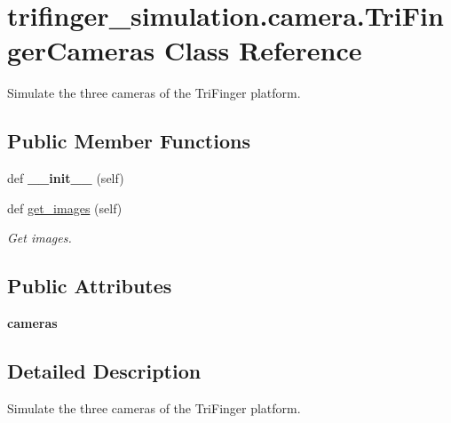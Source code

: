\hypertarget{classtrifinger__simulation_1_1camera_1_1TriFingerCameras}{}\section{trifinger\+\_\+simulation.\+camera.\+Tri\+Finger\+Cameras Class Reference}
\label{classtrifinger__simulation_1_1camera_1_1TriFingerCameras}


Simulate the three cameras of the Tri\+Finger platform.  


\subsection*{Public Member Functions}
\begin{DoxyCompactItemize}
\item 
\mbox{\label{classtrifinger__simulation_1_1camera_1_1TriFingerCameras_a9a72d28e90618b812d207115e04f7bc1}} 
def {\bfseries \+\_\+\+\_\+init\+\_\+\+\_\+} (self)
\item 
def \hyperlink{classtrifinger__simulation_1_1camera_1_1TriFingerCameras_ab87b4d284e9a42deebe874ad5fb233b9}{get\+\_\+images} (self)
\begin{DoxyCompactList}\small\item\em Get images. \end{DoxyCompactList}\end{DoxyCompactItemize}
\subsection*{Public Attributes}
\begin{DoxyCompactItemize}
\item 
\mbox{\label{classtrifinger__simulation_1_1camera_1_1TriFingerCameras_a41e19e51c303a91ecc953c2b41c787b6}} 
{\bfseries cameras}
\end{DoxyCompactItemize}


\subsection{Detailed Description}
Simulate the three cameras of the Tri\+Finger platform. 



